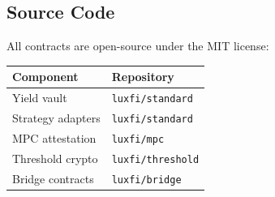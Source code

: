 \subsection{Source Code}

All contracts are open-source under the MIT license:

\begin{table}[h]
\centering
\small
\begin{tabular}{@{}ll@{}}
\toprule
\textbf{Component} & \textbf{Repository} \\
\midrule
Yield vault & \texttt{luxfi/standard} \\
Strategy adapters & \texttt{luxfi/standard} \\
MPC attestation & \texttt{luxfi/mpc} \\
Threshold crypto & \texttt{luxfi/threshold} \\
Bridge contracts & \texttt{luxfi/bridge} \\
\bottomrule
\end{tabular}
\end{table}

